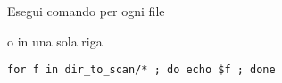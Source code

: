 \documentclass[]{article}
\newenvironment{Shaded}{}{}
\newcommand{\KeywordTok}[1]{\textcolor[rgb]{0.00,0.44,0.13}{\textbf{{#1}}}}
\newcommand{\OtherTok}[1]{\textcolor[rgb]{0.00,0.44,0.13}{{#1}}}
\newcommand{\NormalTok}[1]{{#1}}
\begin{document}
Esegui comando per ogni file

\begin{Shaded}
\end{Shaded}

o in una sola riga

\begin{verbatim}
for f in dir_to_scan/* ; do echo $f ; done
\end{verbatim}
\end{document}
